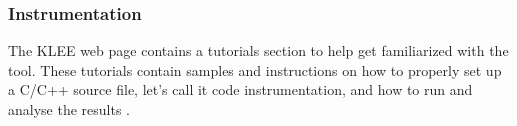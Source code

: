 
\subsubsection{Instrumentation}\label{subsection:klee_instrumentation}

The KLEE web page contains a tutorials section to help get familiarized with the tool. These tutorials contain samples and instructions on how to properly set up a C/C++ source file, let's call it code instrumentation, and how to run and analyse the results \cite{klee_tutorial1,klee_tutorial2}. %

